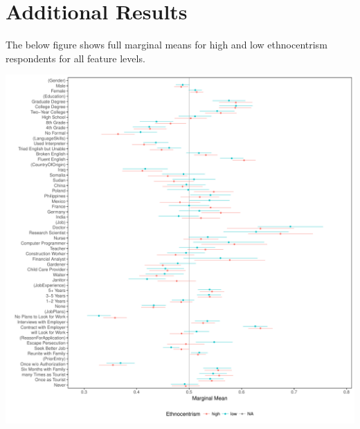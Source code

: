 \documentclass[a4paper,12pt]{article}\usepackage[]{graphicx}\usepackage[]{color}
\makeatletter
\def\maxwidth{ %
  \ifdim\Gin@nat@width>\linewidth
    \linewidth
  \else
    \Gin@nat@width
  \fi
}
\newenvironment{knitrout}{}{} %
\makeatother
\begin{document}

\singlespacing


\clearpage

\appendix

\section{Additional Results}

The below figure shows full marginal means for high and low ethnocentrism respondents for all feature levels.

\begin{knitrout}
\color{fgcolor}
\includegraphics[width=\maxwidth]{figure/hainmueller_mm_by_ethnocentrism-1} 

\end{knitrout}
\end{document}
